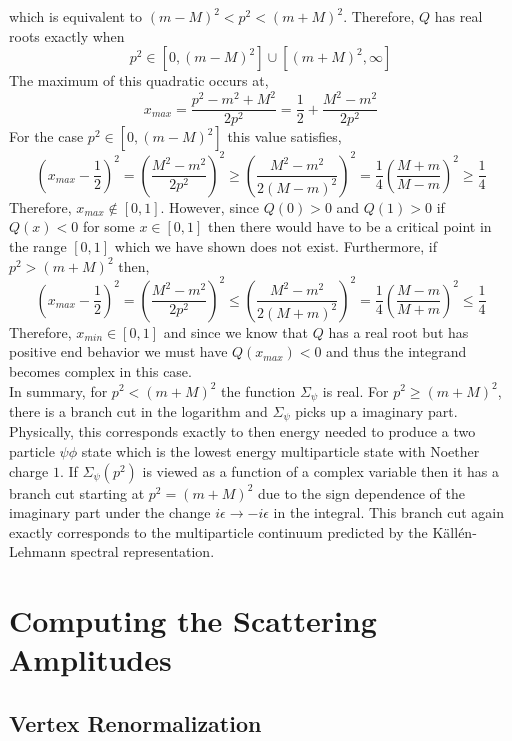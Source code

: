 \documentclass[12pt]{extarticle}
\begin{document}
which is equivalent to $(m - M)^2 < p^2 < (m + M)^2$. Therefore, $Q$ has real roots exactly when\[p^2 \in [0, (m - M)^2] \cup [(m+M)^2, \infty]\]
The maximum of this quadratic occurs at,
\[x_{max} = \frac{p^2 - m^2 + M^2}{2 p^2}  = \frac{1}{2} + \frac{M^2 - m^2}{2 p^2}\]
For the case $p^2 \in [0, (m - M)^2]$ this value satisfies,
\[ \left(x_{max} - \frac{1}{2} \right)^2 = \left( \frac{M^2 - m^2}{2 p^2} \right)^2 \ge \left( \frac{M^2 - m^2}{2 (M - m)^2} \right)^2 = \frac{1}{4} \left( \frac{M + m}{M - m} \right)^2  \ge \frac{1}{4}\]
Therefore, $x_{max} \notin [0, 1]$. However, since $Q(0) > 0$ and $Q(1) > 0$ if $Q(x) < 0$ for some $x \in [0, 1]$ then there would have to be a critical point in the range $[0, 1]$ which we have shown does not exist. Furthermore, if $p^2 > (m + M)^2$ then, 
\[ \left(x_{max} - \frac{1}{2} \right)^2 = \left( \frac{M^2 - m^2}{2 p^2} \right)^2 \le \left( \frac{M^2 - m^2}{2 (M + m)^2} \right)^2 = \frac{1}{4} \left( \frac{M - m}{M + m} \right)^2  \le \frac{1}{4}\]
Therefore, $x_{min} \in [0, 1]$ and since we know that $Q$ has a real root but has positive end behavior we must have $Q(x_{max}) < 0$ and thus the integrand becomes complex in this case. \bigskip\\
In summary, for $p^2 < (m + M)^2$ the function $\Sigma_{\psi}$ is real. For $p^2 \ge (m + M)^2$, there is a branch cut in the logarithm and $\Sigma_\psi$ picks up a imaginary part. Physically, this corresponds exactly to then energy needed to produce a two particle $\psi \phi$ state which is the lowest energy multiparticle state with Noether charge $1$. If $\Sigma_\psi(p^2)$ is viewed as a function of a complex variable then it has a branch cut starting at $p^2 = (m + M)^2$ due to the sign dependence of the imaginary part under the change $i \epsilon \to - i \epsilon$ in the integral. This branch cut again exactly corresponds to the multiparticle continuum predicted by the K{\"a}ll{\'e}n-Lehmann spectral representation.

\section{Computing the Scattering Amplitudes}
\subsection{Vertex Renormalization}
\end{document}
